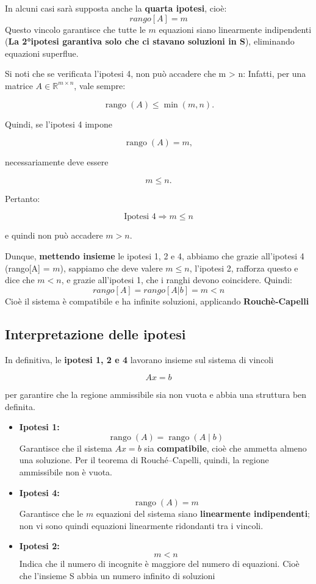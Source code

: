 In alcuni casi sarà supposta anche la \textbf{quarta ipotesi}, cioè:
\begin{equation}
    rango[A] = m
\end{equation}
Questo vincolo garantisce che tutte le $m$ equazioni siano linearmente indipendenti (\textbf{La 2°ipotesi garantiva solo che ci stavano soluzioni in S}), eliminando equazioni superflue.

Si noti che se verificata l'ipotesi 4, non può accadere che m > n:
Infatti, per una matrice \(A\in\mathbb{R}^{m\times n}\), vale sempre:

$$ \operatorname{rango}(A)\leq \min(m,n). $$

Quindi, se l'ipotesi 4 impone

$$ \operatorname{rango}(A)=m, $$

necessariamente deve essere

$$ m\leq n. $$

Pertanto:

$$ \boxed{\text{Ipotesi 4} \Longrightarrow m\leq n} $$

e quindi non può accadere \(m>n\).

Dunque, \textbf{mettendo insieme} le ipotesi 1, 2 e 4, abbiamo che grazie all'ipotesi 4 (rango[A] = $m$), sappiamo che deve valere $m \leq n$, l'ipotesi 2, rafforza questo e dice che $m < n$, e grazie all'ipotesi 1, che i ranghi devono coincidere.  
Quindi:
\begin{equation}
    rango[A] = rango[A|b] = m < n
\end{equation}
Cioè il sistema è compatibile e ha infinite soluzioni, applicando \textbf{Rouchè-Capelli}

\subsection{Interpretazione delle ipotesi}

In definitiva, le \textbf{ipotesi 1, 2 e 4} lavorano insieme sul sistema di vincoli

$$
Ax = b
$$

per garantire che la regione ammissibile sia non vuota e abbia una struttura ben definita.

\begin{itemize}

\item \textbf{Ipotesi 1:}
\[
\operatorname{rango}(A) = \operatorname{rango}(A\mid b)
\]
Garantisce che il sistema $Ax=b$ sia \textbf{compatibile}, cioè che ammetta almeno una soluzione. Per il teorema di Rouché--Capelli, quindi, la regione ammissibile non è vuota.

\item \textbf{Ipotesi 4:}
\[
\operatorname{rango}(A) = m
\]
Garantisce che le $m$ equazioni del sistema siano \textbf{linearmente indipendenti}; non vi sono quindi equazioni linearmente ridondanti tra i vincoli.

\item \textbf{Ipotesi 2:}
\[
m < n
\]
Indica che il numero di incognite è maggiore del numero di equazioni.
Cioè che l'insieme S abbia un numero infinito di soluzioni

\end{itemize}

